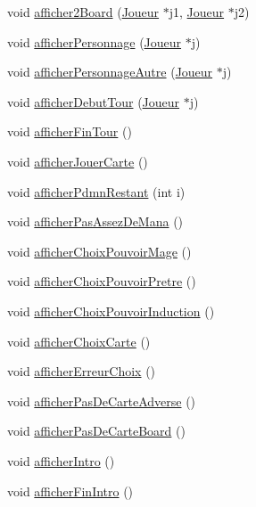 \begin{DoxyCompactItemize}
\item 
void \hyperlink{class_vue_console_af493448120cfaf5c389f741e30bc7b31}{afficher2\-Board} (\hyperlink{class_joueur}{Joueur} $\ast$j1, \hyperlink{class_joueur}{Joueur} $\ast$j2)
\item 
void \hyperlink{class_vue_console_ad450cc024c4c7797c18f399b0f4c321c}{afficher\-Personnage} (\hyperlink{class_joueur}{Joueur} $\ast$j)
\item 
void \hyperlink{class_vue_console_ae015f7453d65bb89abef4793addc18ca}{afficher\-Personnage\-Autre} (\hyperlink{class_joueur}{Joueur} $\ast$j)
\item 
void \hyperlink{class_vue_console_a64ad6e083263f0fadef29b98207cb2aa}{afficher\-Debut\-Tour} (\hyperlink{class_joueur}{Joueur} $\ast$j)
\item 
void \hyperlink{class_vue_console_ada125e06218ee32a5dbacc526e28a84c}{afficher\-Fin\-Tour} ()
\item 
void \hyperlink{class_vue_console_a0f4cab13a73ac5c80881276687a506aa}{afficher\-Jouer\-Carte} ()
\item 
void \hyperlink{class_vue_console_a9f1b65a45e8e3da31ae35fa6c4d53dce}{afficher\-Pdmn\-Restant} (int i)
\item 
void \hyperlink{class_vue_console_a2b469256d2776aa6e01ebc4bd393c2a3}{afficher\-Pas\-Assez\-De\-Mana} ()
\item 
void \hyperlink{class_vue_console_a525f3eacad711387238b37a9b64c5406}{afficher\-Choix\-Pouvoir\-Mage} ()
\item 
void \hyperlink{class_vue_console_ac1e6d5da6ce2c352d10c665d79c616d0}{afficher\-Choix\-Pouvoir\-Pretre} ()
\item 
void \hyperlink{class_vue_console_a884aeedbd65ebe011b86f42d6ae5db04}{afficher\-Choix\-Pouvoir\-Induction} ()
\item 
void \hyperlink{class_vue_console_ad55bf2d0d6397204cccfb488aad39c4e}{afficher\-Choix\-Carte} ()
\item 
void \hyperlink{class_vue_console_a2f811063bc7f2dcac117d7a49df36931}{afficher\-Erreur\-Choix} ()
\item 
void \hyperlink{class_vue_console_a9e339ac2f7b3f337d4a2951db490815b}{afficher\-Pas\-De\-Carte\-Adverse} ()
\item 
void \hyperlink{class_vue_console_a4a9f289f010e643b5e8a004f3fe539ac}{afficher\-Pas\-De\-Carte\-Board} ()
\item 
void \hyperlink{class_vue_console_a1e9faf3a19588ff0f659dfff4cfcff09}{afficher\-Intro} ()
\item 
void \hyperlink{class_vue_console_a945e04f68fb5a0089e35b1b688001b87}{afficher\-Fin\-Intro} ()
\end{DoxyCompactItemize}


